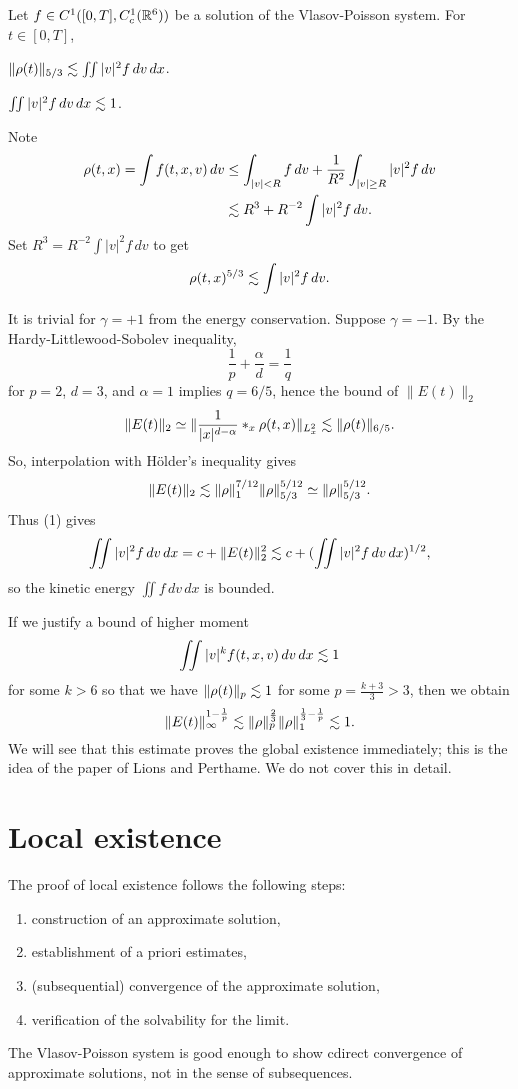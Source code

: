 \documentclass[11pt]{amsart}
\begin{document}
\begin{lem}
Let $f\in C^1([0,T],C_c^1(\mathbb{R}^6))$ be a solution of the Vlasov-Poisson system.
For $t\in[0,T]$,
\begin{cond}
\item $\|\rho(t)\|_{5/3}\lesssim\iint|v|^2f\,dv\,dx$.
\item $\iint|v|^2f\,dv\,dx\lesssim1$.
\end{cond}
\end{lem}
\begin{pfs}
\item
Note
\begin{align*}
\rho(t,x)=\int f(t,x,v)\,dv
&\le\int_{|v|<R}f\,dv+\frac1{R^2}\int_{|v|\ge R}|v|^2f\,dv\\
&\lesssim R^3+ R^{-2}\int|v|^2f\,dv.
\end{align*}
Set $R^3=R^{-2}\int|v|^2f\,dv$ to get
\[\rho(t,x)^{5/3}\lesssim\int|v|^2f\,dv.\]

\item
It is trivial for $\gamma=+1$ from the energy conservation.
Suppose $\gamma=-1$.
By the Hardy-Littlewood-Sobolev inequality,
\[\frac1p+\frac\alpha d=\frac1q\]
for $p=2$, $d=3$, and $\alpha=1$ implies $q=6/5$, hence the bound of $\|E(t)\|_2$
\[\|E(t)\|_2\simeq\|\frac1{|x|^{d-\alpha}}*_x\rho(t,x)\|_{L_x^2}\lesssim\|\rho(t)\|_{6/5}.\]
So, interpolation with H\"older's inequality gives
\[\|E(t)\|_2\lesssim\|\rho\|_1^{7/12}\|\rho\|_{5/3}^{5/12}\simeq\|\rho\|_{5/3}^{5/12}.\]
Thus (1) gives
\[\iint|v|^2f\,dv\,dx=c+\|E(t)\|_2^2\lesssim c+(\iint|v|^2f\,dv\,dx)^{1/2},\]
so the kinetic energy $\iint f\,dv\,dx$ is bounded.\qedhere
\end{pfs}

If we justify a bound of higher moment
\[\iint|v|^kf(t,x,v)\,dv\,dx\lesssim1\]
for some $k>6$ so that we have $\|\rho(t)\|_p\lesssim1$ for some $p=\frac{k+3}3>3$, then we obtain
\[\|E(t)\|_\infty^{1-\frac1p}\lesssim\|\rho\|_p^{\frac23}\|\rho\|_1^{\frac13-\frac1p}\lesssim1.\]
We will see that this estimate proves the global existence immediately; this is the idea of the paper of Lions and Perthame\cite{}.
We do not cover this in detail.





\section{Local existence}

The proof of local existence follows the following steps:
\begin{enumerate}
\item construction of an approximate solution,
\item establishment of a priori estimates,
\item (subsequential) convergence of the approximate solution,
\item verification of the solvability for the limit.
\end{enumerate}
The Vlasov-Poisson system is good enough to show cdirect convergence of approximate solutions, not in the sense of subsequences.
\end{document}
